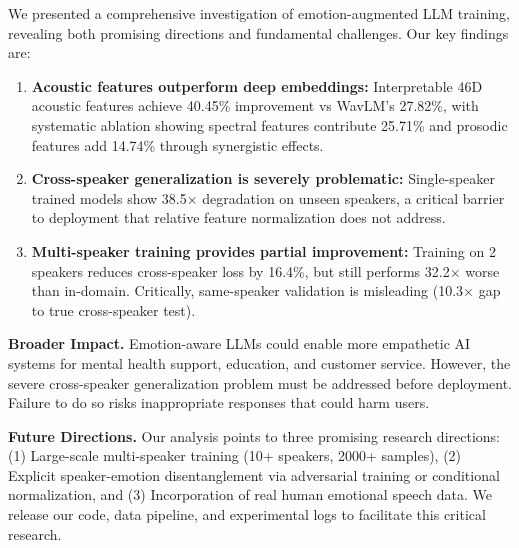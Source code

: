 We presented a comprehensive investigation of emotion-augmented LLM training, revealing both promising directions and fundamental challenges. Our key findings are:

\begin{enumerate}
    \item \textbf{Acoustic features outperform deep embeddings:} Interpretable 46D acoustic features achieve 40.45\% improvement vs WavLM's 27.82\%, with systematic ablation showing spectral features contribute 25.71\% and prosodic features add 14.74\% through synergistic effects.

    \item \textbf{Cross-speaker generalization is severely problematic:} Single-speaker trained models show 38.5× degradation on unseen speakers, a critical barrier to deployment that relative feature normalization does not address.

    \item \textbf{Multi-speaker training provides partial improvement:} Training on 2 speakers reduces cross-speaker loss by 16.4\%, but still performs 32.2× worse than in-domain. Critically, same-speaker validation is misleading (10.3× gap to true cross-speaker test).
\end{enumerate}

\textbf{Broader Impact.} Emotion-aware LLMs could enable more empathetic AI systems for mental health support, education, and customer service. However, the severe cross-speaker generalization problem must be addressed before deployment. Failure to do so risks inappropriate responses that could harm users.

\textbf{Future Directions.} Our analysis points to three promising research directions: (1) Large-scale multi-speaker training (10+ speakers, 2000+ samples), (2) Explicit speaker-emotion disentanglement via adversarial training or conditional normalization, and (3) Incorporation of real human emotional speech data. We release our code, data pipeline, and experimental logs to facilitate this critical research.
